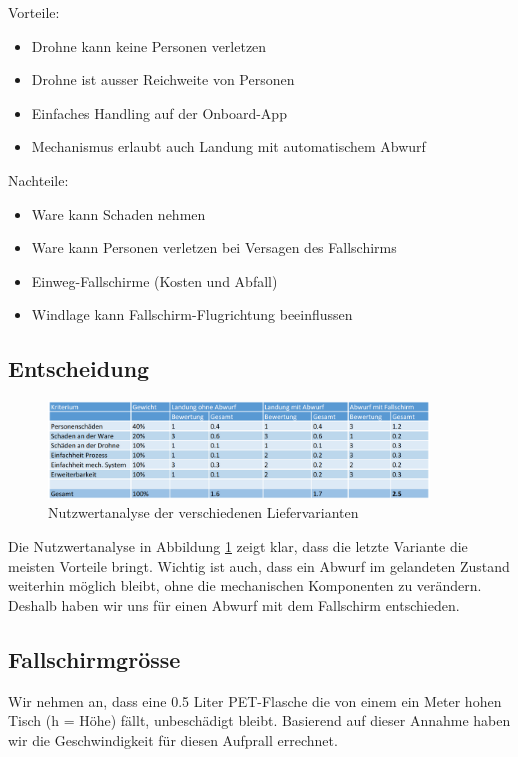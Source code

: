 Vorteile:
\begin{itemize}
	\item Drohne kann keine Personen verletzen
	\item Drohne ist ausser Reichweite von Personen
	\item Einfaches Handling auf der Onboard-App
	\item Mechanismus erlaubt auch Landung mit automatischem Abwurf
\end{itemize}


Nachteile:
\begin{itemize}
	\item Ware kann Schaden nehmen
	\item Ware kann Personen verletzen bei Versagen des Fallschirms
	\item Einweg-Fallschirme (Kosten und Abfall)
	\item Windlage kann Fallschirm-Flugrichtung beeinflussen
\end{itemize}


\subsection{Entscheidung}

\begin{figure}[H]
	\centering
	\includegraphics[width=0.9\textwidth] {images/nutzwertanalyse_abwurf.png}
	\caption{Nutzwertanalyse der verschiedenen Liefervarianten}
	\label{fig:nutzwertanalyse_abwurf}
\end{figure}


Die Nutzwertanalyse in Abbildung \ref{fig:nutzwertanalyse_abwurf} zeigt klar, dass die letzte Variante die meisten Vorteile bringt. Wichtig ist auch, dass ein Abwurf im gelandeten Zustand weiterhin möglich bleibt, ohne die mechanischen Komponenten zu verändern. Deshalb haben wir uns für einen Abwurf mit dem Fallschirm entschieden.

\subsection{Fallschirmgrösse}
Wir nehmen an, dass eine 0.5 Liter PET-Flasche die von einem ein Meter hohen Tisch (h = Höhe) fällt, unbeschädigt bleibt. Basierend auf dieser Annahme haben wir die Geschwindigkeit für diesen Aufprall errechnet.

